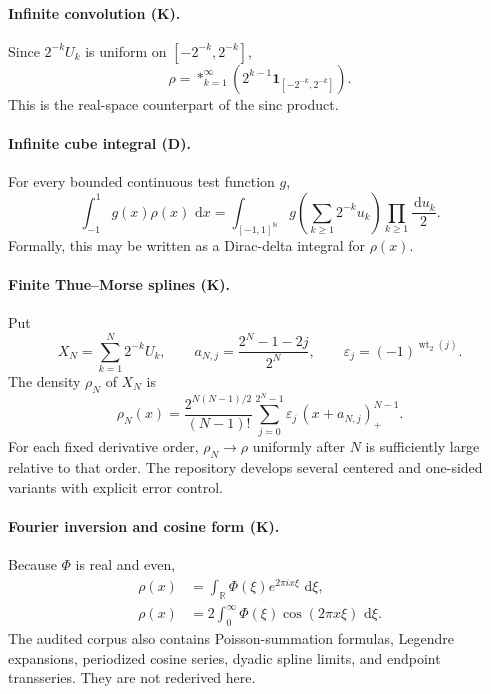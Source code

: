 \documentclass[11pt]{article}
\theoremstyle{definition}
\theoremstyle{remark}
\newcommand{\R}{\mathbb R}
\newcommand{\N}{\mathbb N}
\newcommand{\dd}{\,\mathrm d}
\newcommand{\wt}{\operatorname{wt}_2}
\newcommand{\eps}{\varepsilon}
\newcommand{\one}{\mathbf 1}
\newcommand{\statusknown}{\textsf{K}}
\newcommand{\statusderived}{\textsf{D}}
\begin{document}
\paragraph{Infinite convolution (\statusknown).}
Since \(2^{-k}U_k\) is uniform on \([-2^{-k},2^{-k}]\),
\begin{equation}
 \rho=\mathop{\ast}_{k=1}^{\infty}
 \left(2^{k-1}\one_{[-2^{-k},2^{-k}]}\right).                \label{p3:eq:rho-convolution}
\end{equation}
This is the real-space counterpart of the sinc product.

\paragraph{Infinite cube integral (\statusderived).}
For every bounded continuous test function \(g\),
\begin{equation}
 \int_{-1}^{1}g(x)\rho(x)\,\dd x
 =\int_{[-1,1]^{\N}}g\!\left(\sum_{k\ge1}2^{-k}u_k\right)
   \prod_{k\ge1}\frac{\dd u_k}{2}.                           \label{p3:eq:cube-pushforward}
\end{equation}
Formally, this may be written as a Dirac-delta integral for \(\rho(x)\).

\paragraph{Finite Thue--Morse splines (\statusknown).}
Put
\begin{equation}
 X_N=\sum_{k=1}^{N}2^{-k}U_k,
 \qquad
 a_{N,j}=\frac{2^N-1-2j}{2^N},
 \qquad
 \eps_j=(-1)^{\wt(j)}.                                      \label{p3:eq:aNj}
\end{equation}
The density \(\rho_N\) of \(X_N\) is
\begin{equation}
 \rho_N(x)=\frac{2^{N(N-1)/2}}{(N-1)!}
 \sum_{j=0}^{2^N-1}\eps_j\,(x+a_{N,j})_+^{N-1}.             \label{p3:eq:finite-spline}
\end{equation}
For each fixed derivative order, \(\rho_N\to\rho\) uniformly after \(N\) is sufficiently
large relative to that order.  The repository develops several centered and one-sided
variants with explicit error control.

\paragraph{Fourier inversion and cosine form (\statusknown).}
Because \(\Phi\) is real and even,
\begin{align}
 \rho(x)&=\int_{\R}\Phi(\xi)e^{2\pi i x\xi}\,\dd\xi,
                                                                  \label{p3:eq:rho-fourier-inversion}\\
 \rho(x)&=2\int_0^{\infty}\Phi(\xi)\cos(2\pi x\xi)\,\dd\xi.
                                                                  \label{p3:eq:rho-cosine}
\end{align}
The audited corpus also contains Poisson-summation formulas, Legendre expansions,
periodized cosine series, dyadic spline limits, and endpoint transseries.  They are not
rederived here.
\end{document}
